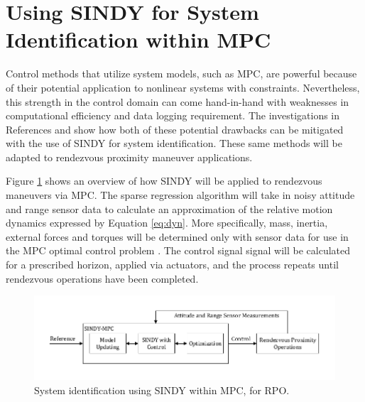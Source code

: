 \documentclass[letterpaper, preprint, paper,11pt]{AAS}	%
\begin{document}
\section{Using SINDY for System Identification within MPC}
Control methods that utilize system models, such as MPC, are powerful because of their potential application to nonlinear systems with constraints. Nevertheless, this strength in the control domain can come hand-in-hand with weaknesses in computational efficiency and data logging requirement. The investigations in References  and  show how both of these potential drawbacks can be mitigated with the use of SINDY for system identification. These same methods will be adapted to rendezvous proximity maneuver applications.

Figure \ref{fig:SINDY_MPC} shows an overview of how SINDY will be applied to rendezvous maneuvers via MPC. The sparse regression algorithm will take in noisy attitude and range sensor data to calculate an approximation of the relative motion dynamics expressed by Equation \eqref{eq:dyn}. More specifically, mass, inertia, external forces and torques will be determined only with sensor data for use in the MPC optimal control problem \cite{KaiserKutz_SINDyMPC}. The control signal signal will be calculated for a prescribed horizon, applied via actuators, and the process repeats until rendezvous operations have been completed.
\begin{figure}[h!]
	\centering\includegraphics[width=5.0in]{Figures/SINDY_MPC.pdf}
	\caption{System identification using SINDY within MPC, for RPO.}
	\label{fig:SINDY_MPC}
\end{figure}
\end{document}
